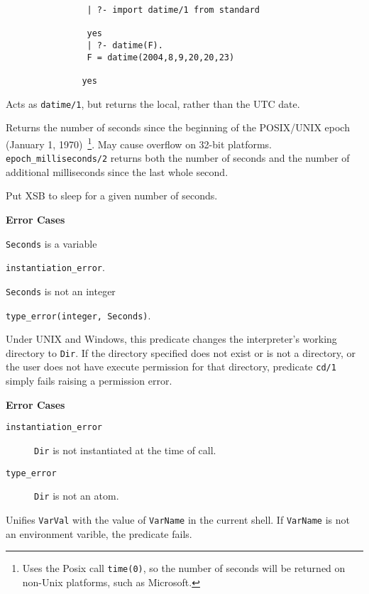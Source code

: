 \begin{description}
{\begin{verbatim}
                | ?- import datime/1 from standard

                yes
                | ?- datime(F).
                F = datime(2004,8,9,20,20,23)

               yes
\end{verbatim}}

%
Acts as {\tt datime/1}, but returns the local, rather than the UTC date.

%
Returns the number of seconds since the beginning of the POSIX/UNIX
epoch (January 1, 1970)~\footnote{Uses the Posix call {\tt time(0)},
  so the number of seconds will be returned on non-Unix platforms,
  such as Microsoft.}.  May cause overflow on 32-bit platforms.
\texttt{epoch\_milliseconds/2} returns both the number of seconds and
the number of additional milliseconds since the last whole second.

\noindent
Put XSB to sleep for a given number of seconds.  

{\bf Error Cases}
\bi
\item 	{\tt Seconds} is a variable
\bi
\item 	{\tt instantiation\_error}.
\ei
\item 	{\tt Seconds} is not an integer
\bi
\item 	{\tt type\_error(integer, Seconds)}.
\ei
\ei

    Under UNIX and Windows, this predicate changes the interpreter's
    working directory to {\tt Dir}.  If the directory specified does
    not exist or is not a directory, or the user does not have execute
    permission for that directory, predicate {\tt cd/1} simply fails
    raising a permission error.

{\bf Error Cases}
    \begin{description}
    \item[{\tt instantiation\_error}]
        {\tt Dir} is not instantiated at the time of call.
    \item[{\tt type\_error}]
        {\tt Dir} is not an atom.
    \end{description}

\noindent
Unifies {\tt VarVal} with the value of {\tt VarName} in the current
shell.  If {\tt VarName} is not an environment varible, the predicate
fails.


\end{description}
